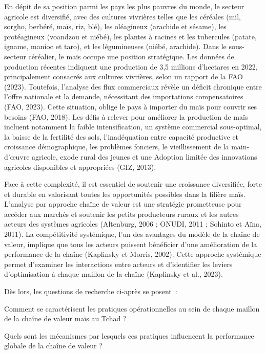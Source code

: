 \documentclass[12pt,oneside]{report}
\begin{document}
En dépit de sa position parmi les pays les plus pauvres du monde, le secteur agricole est diversifié, avec des cultures vivrières telles que les céréales (mil, sorgho, berbéré, maïs, riz, blé), les oléagineux (arachide et sésame), les protéagineux (voandzou et niébé), les plantes à racines et les tubercules (patate, igname, manioc et taro), et les légumineuses (niébé, arachide). Dans le sous-secteur céréalier, le maïs occupe une position stratégique. Les données de production récentes indiquent une production de 3,5 millions d'hectares en 2022, principalement consacrés aux cultures vivrières, selon un rapport de la FAO (2023). Toutefois, l'analyse des flux commerciaux révèle un déficit chronique entre l'offre nationale et la demande, nécessitant des importations compensatoires (FAO, 2023). Cette situation, oblige le pays à importer du maïs pour couvrir ses besoins (FAO, 2018). Les défis à relever pour améliorer la production de maïs incluent notamment la faible intensification, un système commercial sous-optimal, la baisse de la fertilité des sols, l’inadéquation entre capacité productive et croissance démographique, les problèmes fonciers, le vieillissement de la main-d'œuvre agricole, exode rural des jeunes et une Adoption limitée des innovations agricoles disponibles et appropriées (GIZ, 2013).

Face à cette complexité, il est essentiel de soutenir une croissance diversifiée, forte et durable en valorisant toutes les opportunités possibles dans la filière maïs. L'analyse par approche chaîne de valeur est une stratégie prometteuse pour accéder aux marchés et soutenir les petits producteurs ruraux et les autres acteurs des systèmes agricoles (Altenburg, 2006 ; ONUDI, 2011 ; Sohinto et Aïna, 2011). La compétitivité systémique, l'un des avantages du modèle de la chaîne de valeur, implique que tous les acteurs puissent bénéficier d'une amélioration de la performance de la chaîne (Kaplinsky et Morris, 2002). Cette approche systémique permet d'examiner les interactions entre acteurs et d'identifier les leviers d'optimisation à chaque maillon de la chaîne (Kaplinsky et al., 2023).

Dès lors, les questions de recherche ci-après se posent :

Comment se caractérisent les pratiques opérationnelles au sein de chaque maillon de la chaîne de valeur maïs au Tchad ?

Quels sont les mécanismes par lesquels ces pratiques influencent la performance globale de la chaîne de valeur ?
\end{document}
